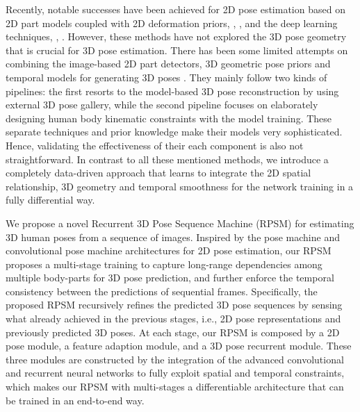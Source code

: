 \documentclass[10pt,twocolumn,letterpaper]{article}
\begin{document}
Recently, notable successes have been achieved for 2D pose estimation based on 2D part models coupled with 2D deformation priors, \eg, \cite{xiaohan2015joint,yang2011articulated}, and the deep learning techniques, \eg, \cite{deeppose, deepfacialpoint, wei2016convolutional,yang2016end}. However, these methods have not explored the 3D pose geometry that is crucial for 3D pose estimation. There has been some limited attempts on combining the image-based 2D part detectors, 3D geometric pose priors and temporal models for generating 3D poses \cite{andriluka2010monocular,zhou2014spatio,zhou2015sparseness,Tekin_2016_CVPR}. They mainly follow two kinds of pipelines: the first \cite{zhou2015sparseness,li2015maximum} resorts to the model-based 3D pose reconstruction by using external 3D pose gallery, while the second pipeline \cite{bogo2016keep,zhou2016deep} focuses on elaborately designing human body kinematic constraints with the model training. These separate techniques and prior knowledge make their models very sophisticated. Hence, validating the effectiveness of their each component is also not straightforward. In contrast to all these mentioned methods, we introduce a completely data-driven approach that learns to integrate the 2D spatial relationship, 3D geometry and temporal smoothness for the network training in a fully differential way.

We propose a novel Recurrent 3D Pose Sequence Machine (RPSM) for estimating 3D human poses from a sequence of images. Inspired by the pose machine \cite{ramakrishna2014pose} and convolutional pose machine \cite{wei2016convolutional} architectures for 2D pose estimation, our RPSM proposes a multi-stage training to capture long-range dependencies among multiple body-parts for 3D pose prediction, and further enforce the temporal consistency between the predictions of sequential frames. Specifically, the proposed RPSM recursively refines the predicted 3D pose sequences by sensing what already achieved in the previous stages, i.e., 2D pose representations and previously predicted 3D poses. At each stage, our RPSM is composed by a 2D pose module, a feature adaption module, and a 3D pose recurrent module. These three modules are constructed by the integration of the advanced convolutional and recurrent neural networks to fully exploit spatial and temporal constraints, which makes our RPSM with multi-stages a differentiable architecture that can be trained in an end-to-end way.
 
\end{document}
